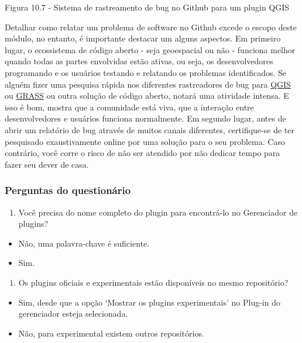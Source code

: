 \documentclass[
  portuguese,
]{krantz}
\providecommand{\tightlist}{%
  \setlength{\itemsep}{0pt}\setlength{\parskip}{0pt}}
\begin{document}
Figura 10.7 - Sistema de rastreamento de bug no Github para um plugin QGIS

Detalhar como relatar um problema de software no Github excede o escopo deste módulo, no entanto, é importante destacar um alguns aspectos. Em primeiro lugar, o ecossistema de código aberto - seja geoespacial ou não - funciona melhor quando todas as partes envolvidas estão ativas, ou seja, os desenvolvedores programando e os usuários testando e relatando os problemas identificados. Se alguém fizer uma pesquisa rápida nos diferentes rastreadores de bug para \href{https://github.com/qgis/QGIS/issues}{QGIS} ou \href{https://github.com/OSGeo/grass/issues}{GRASS} ou outra solução de código aberto, notará uma atividade intensa. E isso é bom, mostra que a comunidade está viva, que a interação entre desenvolvedores e usuários funciona normalmente. Em segundo lugar, antes de abrir um relatório de bug através de muitos canais diferentes, certifique-se de ter pesquisado exaustivamente online por uma solução para o seu problema. Caso contrário, você corre o risco de não ser atendido por não dedicar tempo para fazer seu dever de casa.

\hypertarget{perguntas-do-questionuxe1rio-18}{%
\subsubsection{\texorpdfstring{\textbf{Perguntas do questionário}}{Perguntas do questionário}}\label{perguntas-do-questionuxe1rio-18}}

\begin{enumerate}
\def\labelenumi{\arabic{enumi}.}
\tightlist
\item
  Você precisa do nome completo do plugin para encontrá-lo no Gerenciador de plugins?
\end{enumerate}

\begin{itemize}
\tightlist
\item
  { Não, uma palavra-chave é suficiente. }
\item
  Sim.
\end{itemize}

\begin{enumerate}
\def\labelenumi{\arabic{enumi}.}
\setcounter{enumi}{1}
\tightlist
\item
  Os plugins oficiais e experimentais estão disponíveis no mesmo repositório?
\end{enumerate}

\begin{itemize}
\tightlist
\item
  { Sim, desde que a opção `Mostrar os plugins experimentais' no Plug-in do gerenciador esteja selecionada. }
\item
  Não, para experimental existem outros repositórios.
\end{itemize}
\end{document}
